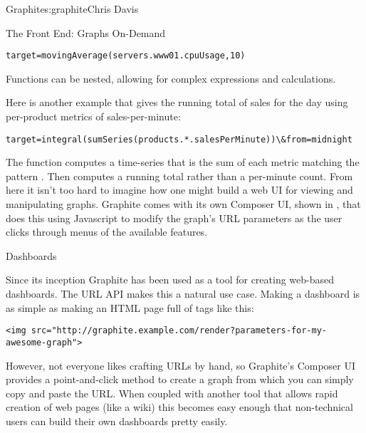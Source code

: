 \begin{aosachapter}{Graphite}{s:graphite}{Chris Davis}
\begin{aosasect1}{The Front End: Graphs On-Demand}
\begin{verbatim}
target=movingAverage(servers.www01.cpuUsage,10)
\end{verbatim}

\noindent
Functions can be nested, allowing for complex expressions and
calculations.

\pagebreak

Here is another example that gives the running total of sales for the
day using per-product metrics of sales-per-minute:

\begin{verbatim}
target=integral(sumSeries(products.*.salesPerMinute))\&from=midnight
\end{verbatim}

\noindent
The  function computes a time-series that is the sum
of each metric matching the pattern
. Then  computes a
running total rather than a per-minute count. From here it isn't too
hard to imagine how one might build a web UI for viewing and
manipulating graphs. Graphite comes with its own Composer UI, shown in
, that does this using Javascript to modify the
graph's URL parameters as the user clicks through menus of the
available features.


\end{aosasect1}

\begin{aosasect1}{Dashboards}

Since its inception Graphite has been used as a tool for creating
web-based dashboards. The URL API makes this a natural use
case. Making a dashboard is as simple as making an HTML page full of
tags like this:

\begin{verbatim}
<img src="http://graphite.example.com/render?parameters-for-my-awesome-graph">
\end{verbatim}

However, not everyone likes crafting URLs by hand, so Graphite's Composer UI
provides a point-and-click method to create a graph from which you can
simply copy and paste the URL\@. When coupled with another tool that
allows rapid creation of web pages (like a wiki) this becomes easy
enough that non-technical users can build their own dashboards pretty
easily.

\end{aosasect1}


\end{aosachapter}
